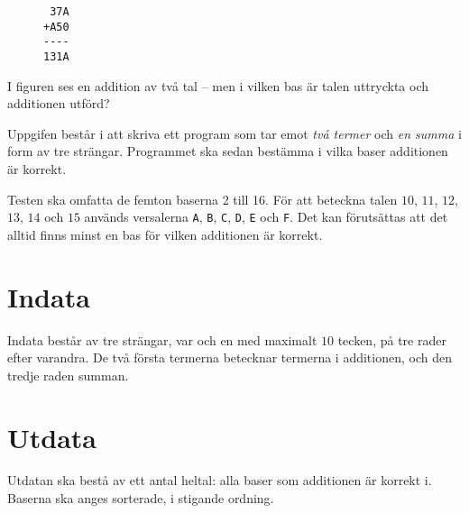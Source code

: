 
\begin{figure}
\centering
\begin{verbatim}
 37A
+A50
----
131A
\end{verbatim}
\end{figure}

I figuren ses en addition av två tal -- men i vilken bas är talen uttryckta och additionen utförd?

Uppgifen består i att skriva ett program som tar emot \emph{två termer} och \emph{en summa} i form
av tre strängar. Programmet ska sedan bestämma i vilka baser additionen är korrekt.

Testen ska omfatta de femton baserna 2 till 16. För att beteckna talen $10$, $11$, $12$, $13$, $14$ och $15$ används
versalerna \texttt{A}, \texttt{B}, \texttt{C}, \texttt{D}, \texttt{E} och \texttt{F}. Det kan förutsättas
att det alltid finns minst en bas för vilken additionen är korrekt.

\section*{Indata}
Indata består av tre strängar, var och en med maximalt $10$ tecken, på tre rader efter varandra. De två första
termerna betecknar termerna i additionen, och den tredje raden summan.

\section*{Utdata}
Utdatan ska bestå av ett antal heltal: alla baser som additionen är korrekt i. Baserna ska anges sorterade, i stigande ordning.
